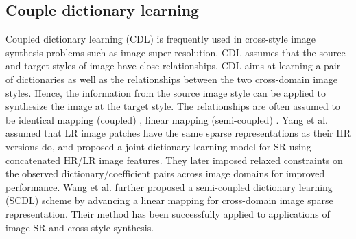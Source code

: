 \documentclass[10pt,twocolumn,letterpaper]{article}
\begin{document}
\subsection{Couple dictionary learning}
Coupled dictionary learning (CDL) is frequently used in cross-style image synthesis problems such as image super-resolution. CDL assumes that the source and target styles of image have close relationships. CDL aims at learning a pair of dictionaries as well as the relationships between the two cross-domain image styles. Hence, the information from the source image style can be applied to synthesize the image at the target style. The relationships are often assumed to be identical mapping (coupled) \cite{yang2010image}, linear mapping (semi-coupled) \cite{wang2012semi}. Yang et al. \cite{yang2010image} assumed that LR image patches have the same sparse representations as their HR versions do, and proposed a joint dictionary learning model for SR using concatenated HR/LR image features. They later imposed relaxed constraints on the observed dictionary/coefficient pairs across image domains for improved performance. Wang et al. \cite{wang2012semi} further proposed a semi-coupled dictionary
learning (SCDL) scheme by advancing a linear mapping for cross-domain image sparse representation. Their method
has been successfully applied to applications of image SR and cross-style synthesis.
\end{document}

